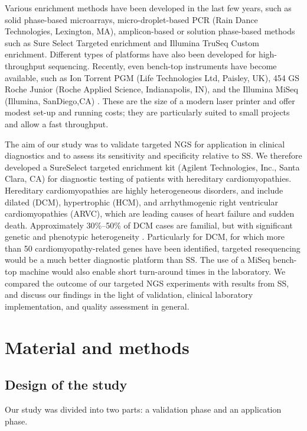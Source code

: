 Various enrichment methods have been developed in the last few years, such as solid phase-based microarrays, micro-droplet-based PCR (Rain Dance Technologies, Lexington, MA), amplicon-based or solution phase-based methods such as Sure Select Targeted enrichment and Illumina TruSeq Custom enrichment. 
Different types of platforms have also been developed for high-throughput sequencing. 
Recently, even bench-top instruments have become available, such as Ion Torrent PGM (Life Technologies Ltd, Paisley, UK), 454 GS Roche Junior (Roche Applied Science, Indianapolis, IN), and the Illumina MiSeq (Illumina, SanDiego,CA) \cite{Loman_2012}. 
These are the size of a modern laser printer and offer modest set-up and running costs; they are particularly suited to small projects and allow a fast throughput. 

The aim of our study was to validate targeted NGS for application in clinical diagnostics and to assess its sensitivity and specificity relative to SS. 
We therefore developed a SureSelect targeted enrichment kit (Agilent Technologies, Inc., Santa Clara, CA) for diagnostic testing of patients with hereditary cardiomyopathies. 
Hereditary cardiomyopathies are highly heterogeneous disorders, and include dilated (DCM), hypertrophic (HCM), and arrhythmogenic right ventricular cardiomyopathies (ARVC), which are leading causes of heart failure and sudden death. 
Approximately 30\%–50\% of DCM cases are familial, but with significant genetic and phenotypic heterogeneity \cite{Posafalvi_2012}. 
Particularly for DCM, for which more than 50 cardiomyopathy-related genes have been identified, targeted resequencing would be a much better diagnostic platform than SS. 
The use of a MiSeq bench-top machine would also enable short turn-around times in the laboratory. 
We compared the outcome of our targeted NGS experiments with results from SS, and discuss our findings in the light of validation, clinical laboratory implementation, and quality assessment in general.

\section{Material and methods}

\subsection{Design of the study}
Our study was divided into two parts: a validation phase and an application phase.

